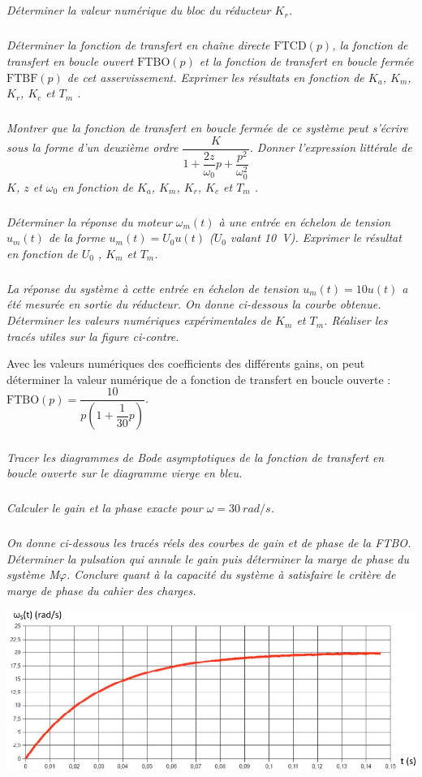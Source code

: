 \documentclass[10pt,fleqn]{article} %
\begin{document}
\begin{multicols}{2}
\subparagraph{}\textit{Déterminer la valeur numérique du bloc du réducteur $K_r$. }


\subparagraph{}\textit{Déterminer la fonction de transfert en chaîne directe $\text{FTCD}(p)$, la fonction de transfert en boucle ouvert $\text{FTBO}(p)$ et la fonction de transfert en boucle fermée $\text{FTBF}(p)$ de cet asservissement. Exprimer les résultats en fonction de $K_a$, $K_m$, $K_r$, $K_c$ et $T_m$ . }


\subparagraph{}\textit{Montrer que la fonction de transfert en boucle fermée de ce système peut s'écrire sous la forme d'un deuxième ordre $\dfrac{K}{1+\dfrac{2z}{\omega_0}p+\dfrac{p^2}{\omega_0^2}}$. Donner l’expression littérale de $K$, $z$ et $\omega_0$ en fonction de $K_a$, $K_m$, $K_r$, $K_c$ et $T_m$ . }


\subparagraph{}\textit{Déterminer la réponse du moteur $\omega_m (t)$ à une entrée en échelon de tension $u_m (t)$ de la forme $u_m (t)  = U_0 u(t)$ ($U_0$ valant \SI{10}{V}). Exprimer le résultat en fonction de $U_0$ , $K_m$ et $T_m$. }


\subparagraph{}\textit{La réponse du système à cette entrée en échelon de tension $u_m (t) =10u(t)$ a été mesurée en sortie du réducteur. On donne ci-dessous la courbe obtenue. Déterminer les valeurs numériques expérimentales de $K_m$ et $T_m$. Réaliser les tracés utiles sur la figure ci-contre.}

\vspace{.5cm}

Avec les valeurs numériques des coefficients des différents gains, on peut déterminer la valeur numérique de a fonction de transfert en boucle ouverte : $\text{FTBO}(p)=\dfrac{10}{p\left(1+\dfrac{1}{30}p\right)}$.

\subparagraph{}\textit{Tracer les diagrammes de Bode asymptotiques de la fonction de transfert en boucle ouverte sur le diagramme vierge en bleu. }


\subparagraph{}\textit{Calculer le gain et la phase exacte pour $\omega = \SI{30}{rad/s}$.}


\subparagraph{}\textit{On donne ci-dessous les tracés réels des courbes de gain et de phase de la FTBO. Déterminer la pulsation qui annule le gain puis déterminer la marge de phase du système M$\varphi$. Conclure quant à la capacité du système à satisfaire le critère de marge de phase du cahier des charges. }



\begin{center}
\includegraphics[width=\linewidth]{images/fig_05}
\end{center}

\end{multicols}
\end{document}
